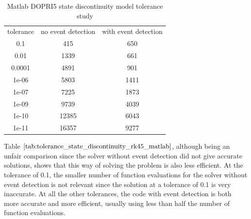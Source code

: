 \begin{table}[h]
\caption {Matlab DOPRI5 state discontinuity model tolerance study} \label{tab:tolerance_state_discontinuity_rk45_matlab} 
\begin{center}
\begin{tabular}{ c c c }
tolerance & no event detection & with event detection \\
0.1 & 415 & 650 \\
0.01 & 1339 & 661 \\
0.0001 & 4891 & 901 \\
1e-06 & 5803 & 1411 \\
1e-07 & 7225 & 1873 \\
1e-09 & 9739 & 4039 \\
1e-10 & 12385 & 6043 \\
1e-11 & 16357 & 9277 \\
\end{tabular}
\end{center}
\end{table}

Table $\ref{tab:tolerance_state_discontinuity_rk45_matlab}$, although being an unfair comparison since the solver without event detection did not give accurate solutions, shows that this way of solving the problem is also less efficient. At the tolerance of 0.1, the smaller number of function evaluations for the solver without event detection is not relevant since the solution at a tolerance of 0.1 is very inaccurate. At all the other tolerances, the code with event detection is both more accurate and more efficient, usually using less than half the number of function evaluations.


